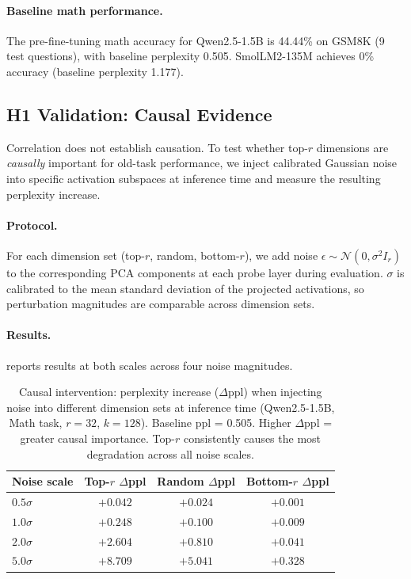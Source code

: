 \paragraph{Baseline math performance.}
The pre-fine-tuning math accuracy for Qwen2.5-1.5B is 44.44\% on GSM8K (9 test questions), with baseline perplexity 0.505.
SmolLM2-135M achieves 0\% accuracy (baseline perplexity 1.177).

\subsection{H1 Validation: Causal Evidence}
\label{sec:causal}

Correlation does not establish causation.
To test whether top-$r$ dimensions are \emph{causally} important for old-task performance, we inject calibrated Gaussian noise into specific activation subspaces at inference time and measure the resulting perplexity increase.

\paragraph{Protocol.}
For each dimension set (top-$r$, random, bottom-$r$), we add noise $\epsilon \sim \mathcal{N}(0, \sigma^2 I_r)$ to the corresponding PCA components at each probe layer during evaluation.
$\sigma$ is calibrated to the mean standard deviation of the projected activations, so perturbation magnitudes are comparable across dimension sets.

\paragraph{Results.}
 reports results at both scales across four noise magnitudes.

\begin{table}[t]
\centering
\caption{Causal intervention: perplexity increase ($\Delta$ppl) when injecting noise into different dimension sets at inference time (Qwen2.5-1.5B, Math task, $r = 32$, $k = 128$). Baseline ppl = 0.505. Higher $\Delta$ppl = greater causal importance. Top-$r$ consistently causes the most degradation across all noise scales.}
\label{tab:causal}
\begin{tabular}{lccc}
\toprule
Noise scale & Top-$r$ $\Delta$ppl & Random $\Delta$ppl & Bottom-$r$ $\Delta$ppl \\
\midrule
$0.5\sigma$ & $+0.042$ & $+0.024$ & $+0.001$ \\
$1.0\sigma$ & $+0.248$ & $+0.100$ & $+0.009$ \\
$2.0\sigma$ & $+2.604$ & $+0.810$ & $+0.041$ \\
$5.0\sigma$ & $+8.709$ & $+5.041$ & $+0.328$ \\
\bottomrule
\end{tabular}
\end{table}

